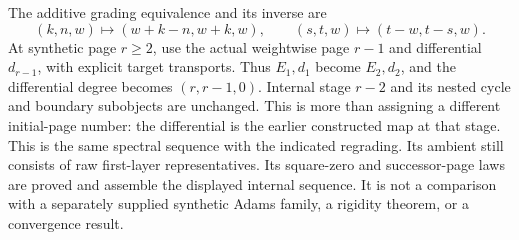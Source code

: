 \begin{definition}
  \label{def:lambda-normalized-sequence}
  \leanok
  The additive grading equivalence and its inverse are
  \[
    (k,n,w)\longmapsto(w+k-n,w+k,w),\qquad
    (s,t,w)\longmapsto(t-w,t-s,w).
  \]
  At synthetic page $r\ge2$, use the actual weightwise page $r-1$ and
  differential $d_{r-1}$, with explicit target transports. Thus
  $E_1,d_1$ become $E_2,d_2$, and the differential degree becomes
  $(r,r-1,0)$. Internal stage $r-2$ and its nested cycle and boundary
  subobjects are unchanged. This is more than assigning a different
  initial-page number: the differential is the earlier constructed map
  at that stage.
  This is the same spectral sequence with the indicated regrading. Its ambient still consists of raw
  first-layer representatives. Its square-zero and successor-page laws
  are proved and assemble the displayed internal sequence. It is not a
  comparison with a separately supplied
  synthetic Adams family, a rigidity theorem, or a convergence result.
\end{definition}

